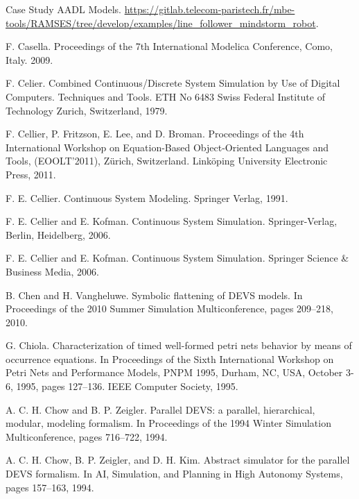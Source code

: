 \begin{description}[style=nextline,leftmargin=12mm,labelwidth=10mm,font=\normalfont]
\item[{[63]}] Case Study AADL Models. \url{https://gitlab.telecom-paristech.fr/mbe-tools/RAMSES/tree/develop/examples/line_follower_mindstorm_robot}.

\item[{[64]}] F. Casella. Proceedings of the 7th International Modelica Conference, Como, Italy. 2009.

\item[{[65]}] F. Celier. Combined Continuous/Discrete System Simulation by Use of Digital Computers. Techniques and Tools. ETH No 6483 Swiss Federal Institute of Technology Zurich, Switzerland, 1979.

\item[{[66]}] F. Cellier, P. Fritzson, E. Lee, and D. Broman. Proceedings of the 4th International Workshop on Equation-Based Object-Oriented Languages and Tools, (EOOLT’2011), Zürich, Switzerland. Linköping University Electronic Press, 2011.

\item[{[67]}] F. E. Cellier. Continuous System Modeling. Springer Verlag, 1991.

\item[{[68]}] F. E. Cellier and E. Kofman. Continuous System Simulation. Springer-Verlag, Berlin, Heidelberg, 2006.

\item[{[69]}] F. E. Cellier and E. Kofman. Continuous System Simulation. Springer Science \& Business Media, 2006.

\item[{[70]}] B. Chen and H. Vangheluwe. Symbolic flattening of DEVS models. In Proceedings of the 2010 Summer Simulation Multiconference, pages 209–218, 2010.

\item[{[71]}] G. Chiola. Characterization of timed well-formed petri nets behavior by means of occurrence equations. In Proceedings of the Sixth International Workshop on Petri Nets and Performance Models, PNPM 1995, Durham, NC, USA, October 3-6, 1995, pages 127–136. IEEE Computer Society, 1995.

\item[{[72]}] A. C. H. Chow and B. P. Zeigler. Parallel DEVS: a parallel, hierarchical, modular, modeling formalism. In Proceedings of the 1994 Winter Simulation Multiconference, pages 716–722, 1994.

\item[{[73]}] A. C. H. Chow, B. P. Zeigler, and D. H. Kim. Abstract simulator for the parallel DEVS formalism. In AI, Simulation, and Planning in High Autonomy Systems, pages 157–163, 1994.


\end{description}
